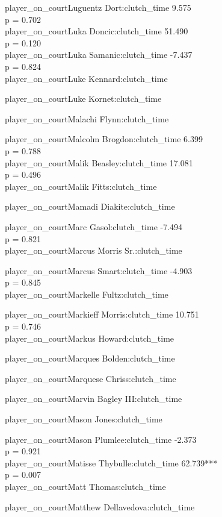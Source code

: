 \documentclass[
  landscape]{article}
\begin{document}
player\_on\_courtLuguentz Dort:clutch\_time 9.575\\
p = 0.702\\
player\_on\_courtLuka Doncic:clutch\_time 51.490\\
p = 0.120\\
player\_on\_courtLuka Samanic:clutch\_time -7.437\\
p = 0.824\\
player\_on\_courtLuke Kennard:clutch\_time

player\_on\_courtLuke Kornet:clutch\_time

player\_on\_courtMalachi Flynn:clutch\_time

player\_on\_courtMalcolm Brogdon:clutch\_time 6.399\\
p = 0.788\\
player\_on\_courtMalik Beasley:clutch\_time 17.081\\
p = 0.496\\
player\_on\_courtMalik Fitts:clutch\_time

player\_on\_courtMamadi Diakite:clutch\_time

player\_on\_courtMarc Gasol:clutch\_time -7.494\\
p = 0.821\\
player\_on\_courtMarcus Morris Sr.:clutch\_time

player\_on\_courtMarcus Smart:clutch\_time -4.903\\
p = 0.845\\
player\_on\_courtMarkelle Fultz:clutch\_time

player\_on\_courtMarkieff Morris:clutch\_time 10.751\\
p = 0.746\\
player\_on\_courtMarkus Howard:clutch\_time

player\_on\_courtMarques Bolden:clutch\_time

player\_on\_courtMarquese Chriss:clutch\_time

player\_on\_courtMarvin Bagley III:clutch\_time

player\_on\_courtMason Jones:clutch\_time

player\_on\_courtMason Plumlee:clutch\_time -2.373\\
p = 0.921\\
player\_on\_courtMatisse Thybulle:clutch\_time 62.739***\\
p = 0.007\\
player\_on\_courtMatt Thomas:clutch\_time

player\_on\_courtMatthew Dellavedova:clutch\_time
\end{document}
